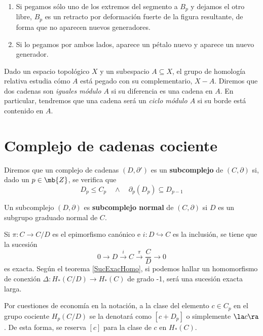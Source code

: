 \begin{enumerate}
\item Si pegamos sólo uno de los extremos del segmento a $B_p$ y dejamos el otro libre, $B_p$ es un retracto por deformación fuerte de la figura resultante, de forma que no aparecen nuevos generadores.
\item Si lo pegamos por ambos lados, aparece un pétalo nuevo y aparece un nuevo generador.
\end{enumerate}


Dado un espacio topológico $X$ y un subespacio $A \subseteq X$, el grupo de homología relativa estudia cómo $A$ está pegado con su complementario, $X-A$. Diremos que dos cadenas son \textit{iguales módulo $A$} si su diferencia es una cadena en $A$. En particular, tendremos que una cadena será un \textit{ciclo módulo $A$} si su borde está contenido en $A$.

\section{Complejo de cadenas cociente}
Diremos que un complejo de cadenas $(D,\partial')$ es un \textbf{subcomplejo} de $(C,\partial)$ si, dado un $p \in \mb{Z}$, se verifica que $$D_p \leq C_p \quad \land \quad \partial_p(D_p)\subseteq D_{p-1}$$

Un subcomplejo $(D,\partial)$ es \textbf{subcomplejo normal} de $(C,\partial)$ si $D$ es un subgrupo graduado normal de $C$.


Si $\pi: C \longrightarrow C/D$ es el epimorfismo canónico e $i: D \hookrightarrow C$ es la inclusión, se tiene que la sucesión $$0 \longrightarrow D \xrightarrow{i} C \xrightarrow{\pi} \frac{C}{D} \longrightarrow 0$$ es exacta. Según el teorema \ref{SucExacHomo}, si podemos hallar un homomorfismo de conexión $\Delta: H_*(C/D) \longrightarrow H_*(C)$ de grado -1,  será una sucesión exacta larga.
\\

\begin{nota}
Por cuestiones de economía en la notación, a la clase del elemento $c \in C_p$ en el grupo cociente $H_p(C/D)$ se la denotará como $[c+D_p]$ o simplemente $\la c\ra$. De esta forma, se reserva $[c]$ para la clase de $c$ en $H_*(C)$.
\end{nota}


